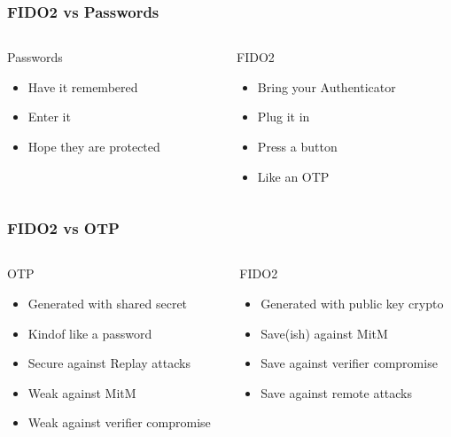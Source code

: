 \documentclass{beamer}
\begin{document}
\begin{frame}[fragile]
  \frametitle{FIDO2 vs Passwords}
  \begin{columns}
    \begin{column}{0.5\textwidth}
      Passwords
      \begin{itemize}
        \item Have it remembered
        \item Enter it
        \item Hope they are protected
      \end{itemize}
    \end{column}
    \pause
    \begin{column}{0.5\textwidth}
      FIDO2
      \begin{itemize}
        \item Bring your Authenticator
        \item Plug it in
        \item Press a button
        \item Like an OTP
      \end{itemize}
    \end{column}
  \end{columns}
\end{frame}

\begin{frame}[fragile]
  \frametitle{FIDO2 vs OTP}
  \begin{columns}
    \begin{column}{0.5\textwidth}
      OTP
      \begin{itemize}
        \item Generated with shared secret
        \item Kindof like a password
        \item Secure against Replay attacks
        \item Weak against MitM
        \item Weak against verifier compromise
      \end{itemize}
    \end{column}
    \pause
    \begin{column}{0.5\textwidth}
      FIDO2
      \begin{itemize}
        \item Generated with public key crypto
        \item Save(ish) against MitM
        \item Save against verifier compromise
        \item Save against remote attacks
      \end{itemize}
    \end{column}
  \end{columns}
\end{frame}
\end{document}
